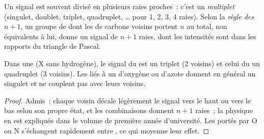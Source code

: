 \begin{definition}\label{def:g12:proton-nmr:multiplet}
Un signal est souvent divisé en plusieurs raies proches~: c'est un
\emph{multiplet} (singulet, doublet, triplet,
quadruplet, \dots{} pour 1, 2, 3, 4 raies). Selon la
\emph{règle des $n+1$}, un groupe de
 dont les  de carbone voisins portent $n$
 au total, non équivalents à lui, donne un signal de $n+1$ raies,
dont les intensités sont dans les rapports du triangle de Pascal.
\end{definition}

\begin{proposition}\label{prop:g12:proton-nmr:n-plus-one}
Dans une   (X sans hydrogène), le signal du
 est un triplet (2  voisins) et celui du  un
quadruplet (3  voisins). Les  liés à un  d'oxygène ou
d'azote donnent en général un singulet et ne couplent pas avec leurs
voisins.
\end{proposition}

\begin{proof}
Admis~: chaque  voisin décale légèrement le signal vers le haut ou
vers le bas selon son propre état, et les combinaisons donnent $n+1$
raies~; la physique en est expliquée dans le volume de première année
d'université. Les  portés par O ou N s'échangent rapidement entre
, ce qui moyenne leur effet.
\end{proof}

